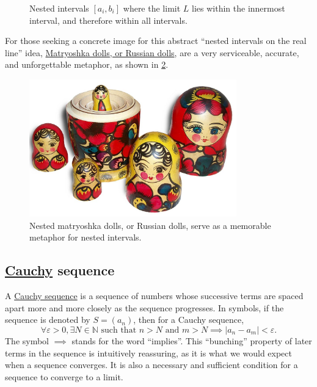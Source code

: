 \documentclass[
  a4paper,
]{article}
\begin{document}
\begin{figure}
\centering

\caption{Nested intervals \([a_i, b_i]\) where the limit \(L\) lies
within the innermost interval, and therefore within all
intervals.}\label{fig:nested-bilateral}
\end{figure}

For those seeking a concrete image for this abstract ``nested intervals
on the real line'' idea,
\href{https://en.wikipedia.org/wiki/Matryoshka_doll}{Matryoshka dolls,
or Russian dolls}, are a very serviceable, accurate, and unforgettable
metaphor, as shown in \cref{fig:matryoshka}.

\begin{figure}
\centering
\includegraphics[width=0.8\textwidth,height=\textheight]{images/matryoshka-open.jpg}
\caption[Nested matryoshka dolls, or Russian dolls, serve as a memorable
metaphor for nested intervals.]{Nested matryoshka dolls, or Russian
dolls, serve as a memorable metaphor for nested
intervals.\footnotemark{}}\label{fig:matryoshka}
\end{figure}

\subsection{\texorpdfstring{\href{https://en.wikipedia.org/wiki/Augustin-Louis_Cauchy}{Cauchy}
sequence}{Cauchy sequence}}\label{cauchy-sequence}

A \href{https://en.wikipedia.org/wiki/Cauchy_sequence}{Cauchy sequence}
is a sequence of numbers whose successive terms are spaced apart more
and more closely as the sequence progresses. In symbols, if the sequence
is denoted by \(S = (a_n)\), then for a Cauchy sequence, \[
\forall \varepsilon > 0, \exists N \in \mathbb{N} \text{ such that } n > N \text{ and } m > N \implies |a_n - a_m| < \varepsilon.
\] The symbol \(\implies\) stands for the word ``implies''. This
``bunching'' property of later terms in the sequence is intuitively
reassuring, as it is what we would expect when a sequence converges. It
is also a necessary and sufficient condition for a sequence to converge
to a limit.
\end{document}
